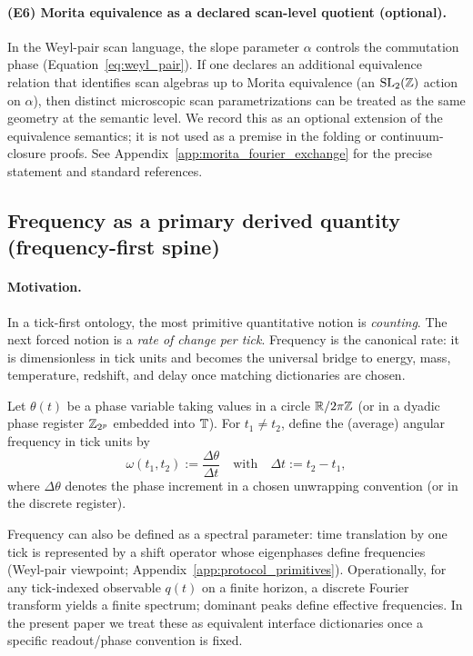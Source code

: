 \paragraph{(E6) Morita equivalence as a declared scan-level quotient (optional).}
\AuditTag In the Weyl-pair scan language, the slope parameter $\alpha$ controls the commutation phase (Equation~\eqref{eq:weyl_pair}).
If one declares an additional equivalence relation that identifies scan algebras up to Morita equivalence (an $\mathrm{SL}_2(\mathbb{Z})$ action on $\alpha$), then distinct microscopic scan parametrizations can be treated as the same geometry at the semantic level.
We record this as an optional extension of the equivalence semantics; it is not used as a premise in the folding or continuum-closure proofs.
See Appendix~\ref{app:morita_fourier_exchange} for the precise statement and standard references.

\subsection{Frequency as a primary derived quantity (frequency-first spine)}
\label{subsec:frequency_first_spine}

\paragraph{Motivation.}
\InterfaceTag In a tick-first ontology, the most primitive quantitative notion is \emph{counting}.
The next forced notion is a \emph{rate of change per tick}.
Frequency is the canonical rate: it is dimensionless in tick units and becomes the universal bridge to energy, mass, temperature, redshift, and delay once matching dictionaries are chosen.

\begin{definition}
\label{def:frequency_from_phase}
Let $\theta(t)$ be a phase variable taking values in a circle $\mathbb{R}/2\pi\mathbb{Z}$ (or in a dyadic phase register $\mathbb{Z}_{2^p}$ embedded into $\mathbb{T}$).
For $t_1\neq t_2$, define the (average) angular frequency in tick units by
\[
\omega(t_1,t_2):=\frac{\Delta\theta}{\Delta t}
\quad\text{with}\quad
\Delta t:=t_2-t_1,
\]
where $\Delta\theta$ denotes the phase increment in a chosen unwrapping convention (or in the discrete register).
\end{definition}

\begin{remark}
\label{rem:frequency_alt_definitions}
Frequency can also be defined as a spectral parameter:
time translation by one tick is represented by a shift operator whose eigenphases define frequencies (Weyl-pair viewpoint; Appendix~\ref{app:protocol_primitives}).
Operationally, for any tick-indexed observable $q(t)$ on a finite horizon, a discrete Fourier transform yields a finite spectrum; dominant peaks define effective frequencies.
In the present paper we treat these as equivalent interface dictionaries once a specific readout/phase convention is fixed.
\end{remark}

